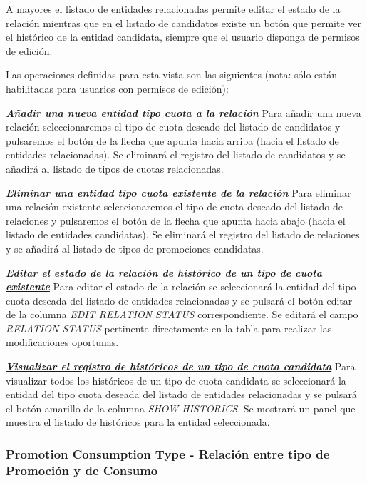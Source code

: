 A mayores el listado de entidades relacionadas permite editar el estado de la relación mientras que en el listado de candidatos existe un botón que permite ver el histórico de la entidad candidata, siempre que el usuario disponga de permisos de edición.


Las operaciones definidas para esta vista son las siguientes (nota: sólo están habilitadas para usuarios con permisos de edición):

\underline{\textsl{\textbf{Añadir una nueva entidad tipo cuota a la relación}}} \newline
Para añadir una nueva relación seleccionaremos el tipo de cuota deseado del listado de candidatos y pulsaremos el botón de la flecha que apunta hacia arriba (hacia el listado de entidades relacionadas). Se eliminará el registro del listado de candidatos y se añadirá al listado de tipos de cuotas relacionadas.


\underline{\textsl{\textbf{Eliminar una entidad tipo cuota existente de la relación}}}\newline
Para eliminar una relación existente seleccionaremos el tipo de cuota deseado del listado de relaciones y pulsaremos el botón de la flecha que apunta hacia abajo (hacia el listado de entidades candidatas). Se eliminará el registro del listado de relaciones y se añadirá al listado de tipos de promociones candidatas.


\underline{\textsl{\textbf{Editar el estado de la relación de histórico de un tipo de cuota existente}}}
Para editar el estado de la relación se seleccionará la entidad del tipo cuota  deseada del listado de entidades relacionadas y se pulsará el botón editar de la columna \textit{EDIT RELATION STATUS} correspondiente. Se editará el campo \emph{RELATION STATUS} pertinente directamente en la tabla para realizar las modificaciones oportunas.

\underline{\textsl{\textbf{Visualizar el registro de históricos de un tipo de cuota candidata}}}
Para visualizar todos los históricos de un tipo de cuota candidata se seleccionará la entidad del tipo cuota deseada del listado de entidades relacionadas y se pulsará el botón amarillo de la columna \textit{SHOW HISTORICS}. Se mostrará un panel que muestra el listado de históricos para la entidad seleccionada. 





\subsubsection{Promotion Consumption Type - Relación entre tipo de Promoción y de Consumo}
\label{sub:promotion-consumption-type-relation}

